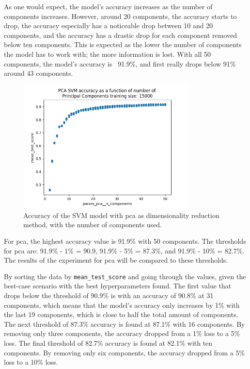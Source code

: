 As one would expect, the model's accuracy increases as the number of components increases. However, around 20 components, the accuracy starts to drop, the accuracy especially has a noticeable drop between 10 and 20 components, and the accuracy has a drastic drop for each component removed below ten components. This is expected as the lower the number of components the model has to work with; the more information is lost. With all 50 components, the model's accuracy is ~91.9\%, and first really drops below 91\% around 43 components.


\begin{figure}[htb!]
    \centering
    \includegraphics[width=0.8\textwidth]{figures/experiment_two/pca_svm_15000.png}
    \caption{Accuracy of the SVM model with \gls{pca} as dimensionality reduction method, with the number of components used.}
    \label{fig:experiment_2_pca_svm}
\end{figure}

For \gls{pca}, the highest accuracy value is 91.9\% with 50 components. The thresholds for \gls{pca} are: 91.9\% - 1\% = 90.9, 91.9\% - 5\% = 87.3\%, and 91.9\% - 10\% = 82.7\%. The results of the experiment for \gls{pca} will be compared to these thresholds.

By sorting the data by \texttt{mean\_test\_score} and going through the values, given the best-case scenario with the best hyperparameters found. The first value that drops below the threshold of 90.9\% is with an accuracy of 90.8\% at 31 components, which means that the model's accuracy only increases by 1\% with the last 19 components, which is close to half the total amount of components.
The next threshold of 87.3\% accuracy is found at 87.1\% with 16 components. By removing only three components, the accuracy dropped from a 1\% loss to a 5\% loss.
The final threshold of 82.7\% accuracy is found at 82.1\% with ten components. By removing only six components, the accuracy dropped from a 5\% loss to a 10\% loss.

